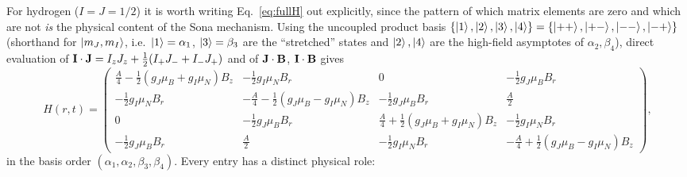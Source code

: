 \documentclass[11pt,a4paper]{article}
\begin{document}
For hydrogen ($I=J=1/2$) it is worth writing Eq.~\eqref{eq:fullH} out
explicitly, since the pattern of which matrix elements are zero and which
are not \emph{is} the physical content of the Sona mechanism. Using the
uncoupled product basis $\{\ket{1},\ket{2},\ket{3},\ket{4}\} =
\{\ket{{+}{+}},\ket{{+}{-}},\ket{{-}{-}},\ket{{-}{+}}\}$ (shorthand for
$\ket{m_J,m_I}$, i.e.\ $\ket{1}=\alpha_1$, $\ket{3}=\beta_3$ are the
``stretched'' states and $\ket{2},\ket{4}$ are the high-field asymptotes of
$\alpha_2,\beta_4$), direct evaluation of
$\vb{I}\cdot\vb{J}=I_zJ_z+\tfrac12(I_+J_-+I_-J_+)$ and of $\vb{J}\cdot\vb{B}$,
$\vb{I}\cdot\vb{B}$ gives
\begin{equation}
    H(r,t) =
    \begin{pmatrix}
        \tfrac{A}{4} - \tfrac12(g_J\mu_B+g_I\mu_N)B_z
        & -\tfrac12 g_I\mu_N B_r
        & 0
        & -\tfrac12 g_J\mu_B B_r \\[4pt]
        -\tfrac12 g_I\mu_N B_r
        & -\tfrac{A}{4} - \tfrac12(g_J\mu_B-g_I\mu_N)B_z
        & -\tfrac12 g_J\mu_B B_r
        & \tfrac{A}{2} \\[4pt]
        0
        & -\tfrac12 g_J\mu_B B_r
        & \tfrac{A}{4} + \tfrac12(g_J\mu_B+g_I\mu_N)B_z
        & -\tfrac12 g_I\mu_N B_r \\[4pt]
        -\tfrac12 g_J\mu_B B_r
        & \tfrac{A}{2}
        & -\tfrac12 g_I\mu_N B_r
        & -\tfrac{A}{4} + \tfrac12(g_J\mu_B-g_I\mu_N)B_z
    \end{pmatrix},
    \label{eq:matrix}
\end{equation}
in the basis order $(\alpha_1,\alpha_2,\beta_3,\beta_4)$. Every entry has a
distinct physical role:
\end{document}
